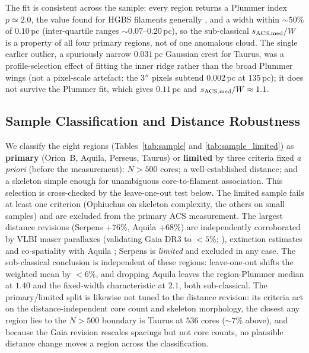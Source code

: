 \documentclass[usenatbib,twoside,twocolumn]{mnras}
\begin{document}
The fit is consistent across the sample: every region returns a Plummer index $p\simeq2.0$, the value found for HGBS filaments generally \citep{Arzoumanian2019}, and a width within $\sim50\%$ of $0.10$\,pc (inter-quartile ranges $\sim0.07$--$0.20$\,pc), so the sub-classical $s_{\rm ACS,med}/W$ is a property of all four primary regions, not of one anomalous cloud. The single earlier outlier, a spuriously narrow $0.031$\,pc Gaussian crest for Taurus, was a profile-selection effect of fitting the inner ridge rather than the broad Plummer wings (not a pixel-scale artefact: the $3''$ pixels subtend $0.002$\,pc at $135$\,pc); it does not survive the Plummer fit, which gives $0.11$\,pc and $s_{\rm ACS,med}/W\approx1.1$.

\subsection{Sample Classification and Distance Robustness}
\label{sec:distance_uncertainties}

We classify the eight regions (Tables~\ref{tab:sample} and \ref{tab:sample_limited}) as \textbf{primary} (Orion~B, Aquila, Perseus, Taurus) or \textbf{limited} by three criteria fixed \emph{a priori} (before the measurement): $N>500$ cores; a well-established distance; and a skeleton simple enough for unambiguous core-to-filament association. This selection is cross-checked by the leave-one-out test below. The limited sample fails at least one criterion (Ophiuchus on skeleton complexity, the others on small samples) and are excluded from the primary ACS measurement. The largest distance revisions (Serpens $+76\%$, Aquila $+68\%$) are independently corroborated by VLBI maser parallaxes (validating Gaia DR3 to $<5\%$; \citealt{Kounkel2018,Xu2021,OrtizLeon2018,OrtizLeon2017}), extinction estimates \citep{Yan2022,Green2024} and co-spatiality with Aquila \citep{Zucker2020}; Serpens is \emph{limited} and excluded in any case. The sub-classical conclusion is independent of these regions: leave-one-out shifts the weighted mean by $<6\%$, and dropping Aquila leaves the region-Plummer median at $1.40$ and the fixed-width characteristic at $2.1$, both sub-classical. The primary/limited split is likewise not tuned to the distance revision: its criteria act on the distance-independent core count and skeleton morphology, the closest any region lies to the $N>500$ boundary is Taurus at $536$ cores ($\sim7\%$ above), and because the Gaia revision rescales spacings but not core counts, no plausible distance change moves a region across the classification.
\end{document}
